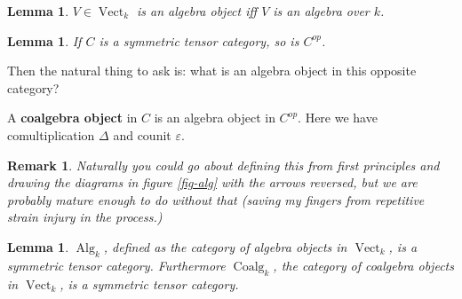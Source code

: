 \documentclass[12pt]{article}
\theoremstyle{break}
\theoremstyle{nonumberbreak}
\theoremstyle{changebreak}
\newtheorem{lem}[thm]{Lemma}
\theoremstyle{break}
\theoremstyle{nonumberbreak}
\theoremstyle{nonumberplain}
\theoremstyle{change}
\newtheorem{rmk}[thm]{Remark}
\newcommand*{\Vectk}{\operatorname{Vect}_k}
\newcommand*{\Algk}{\operatorname{Alg}_k}
\newcommand*{\Coalgk}{\operatorname{Coalg}_k}
\begin{document}
\begin{lem}
	$V\in\Vectk$ is an algebra object iff $V$ is an algebra over $k$.
\end{lem}

\begin{lem}
	If $C$ is a symmetric tensor category, so is $C^{op}$.
\end{lem}

Then the natural thing to ask is: what is an algebra object in this opposite category?
\begin{defn}
	A \textbf{coalgebra object} in $C$ is an algebra object in $C^{op}$. Here we have 
	comultiplication $\Delta$ and counit $\varepsilon$.
\end{defn}
\begin{rmk}
	Naturally you could go about defining this from first principles and drawing the diagrams
	in figure \ref{fig-alg} with the arrows reversed, but we are probably mature enough
	to do without that (saving my fingers from repetitive strain injury in the process.)
\end{rmk}

\begin{lem}
	$\Algk$, defined as the category of algebra objects in $\Vectk$, is a symmetric tensor category. Furthermore
	$\Coalgk$, the category of coalgebra objects in $\Vectk$, is a symmetric tensor category.
\end{lem}
\end{document}
